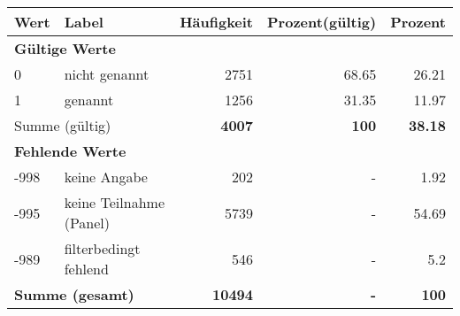      \begin{longtable}{lXrrr}
     \toprule
     \textbf{Wert} & \textbf{Label} & \textbf{Häufigkeit} & \textbf{Prozent(gültig)} & \textbf{Prozent} \\
     \endhead
     \midrule
     \multicolumn{5}{l}{\textbf{Gültige Werte}}\\

     0 &
     \multicolumn{1}{X}{ nicht genannt   } &


       \num{2751} &
       \num[round-mode=places,round-precision=2]{68,65} &
         \num[round-mode=places,round-precision=2]{26,21} \\

     1 &
     \multicolumn{1}{X}{ genannt   } &


       \num{1256} &
       \num[round-mode=places,round-precision=2]{31,35} &
         \num[round-mode=places,round-precision=2]{11,97} \\
     \midrule
     \multicolumn{2}{l}{Summe (gültig)} &
       \textbf{\num{4007}} &
     \textbf{100} &
       \textbf{\num[round-mode=places,round-precision=2]{38,18}} \\
     \multicolumn{5}{l}{\textbf{Fehlende Werte}}\\
       -998 &
       keine Angabe &
         \num{202} &
        - &
         \num[round-mode=places,round-precision=2]{1,92} \\
       -995 &
       keine Teilnahme (Panel) &
         \num{5739} &
        - &
         \num[round-mode=places,round-precision=2]{54,69} \\
       -989 &
       filterbedingt fehlend &
         \num{546} &
        - &
         \num[round-mode=places,round-precision=2]{5,2} \\
     \midrule
     \multicolumn{2}{l}{\textbf{Summe (gesamt)}} &
          \textbf{\num{10494}} &
        \textbf{-} &
        \textbf{100} \\
     \bottomrule
     \end{longtable}
     
